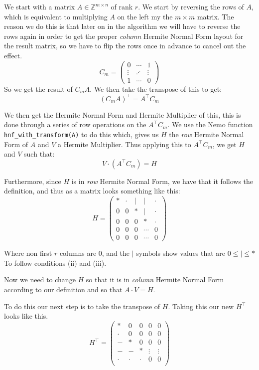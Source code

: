 \documentclass[oneside, a4paper, onecolumn, 11pt]{article}
\newcommand{\Zmn}[2]{\mathbb{Z}^{#1 \times #2}}
\begin{document}
We start with a matrix \(A \in \Zmn{m}{n}\) of rank \(r\). We start by reversing the rows of \(A\), which is equivalent to multiplying \(A\) on the left my the \(m \times m\) matrix. The reason we do this is that later on in the algorithm we will have to reverse the rows again in order to get the proper \textit{column} Hermite Normal Form layout for the result matrix, so we have to flip the rows once in advance to cancel out the effect.
\[
    C_m = \begin{pmatrix}
        0      & \cdots  & 1      \\
        \vdots & \iddots & \vdots \\
        1      & \cdots  & 0
    \end{pmatrix}
\]
So we get the result of \(C_m A\). We then take the transpose of this to get:
\[
    (C_m A)^\intercal = A^\intercal C_m
\]

We then get the Hermite Normal Form and Hermite Multiplier of this, this is done through a series of row operations on the \(A^\intercal C_m\). We use the Nemo function \texttt{hnf\_with\_transform(A)} to do this which, gives us \(H\) the \textit{row} Hermite Normal Form of \(A\) and \(V\) a Hermite Multiplier. Thus applying this to \(A^\intercal C_m\), we get \(H\) and \(V\) such that:
\[
    V \cdot (A^\intercal C_m) = H
\]

Furthermore, since \(H\) is in \textit{row} Hermite Normal Form, we have that it follows the definition, and thus as a matrix looks something like this:
\[
    H = \left(
    \begin{array}{ccccc}
            * & \cdot & | & |      & \cdot \\
            0 & 0     & * & |      & \cdot \\
            0 & 0     & 0 & *      & \cdot \\
            0 & 0     & 0 & \cdots & 0     \\
            0 & 0     & 0 & \cdots & 0
        \end{array}
    \right)
\]

Where non first \(r\) columns are \(0\), and the \(|\) symbols show values that are \(0 \le | \le *\) To follow conditions (ii) and (iii).

Now we need to change \(H\) so that it is in \textit{column} Hermite Normal Form according to our definition and so that \(A \cdot V = H\).

To do this our next step is to take the transpose of \(H\). Taking this our new \(H^\intercal\) looks like this.
\[
    H^\intercal = \left(
    \begin{array}{ccccc}
            *     & 0     & 0     & 0      & 0      \\
            \cdot & 0     & 0     & 0      & 0      \\
            -     & *     & 0     & 0      & 0      \\
            -     & -     & *     & \vdots & \vdots \\
            \cdot & \cdot & \cdot & 0      & 0      \\
        \end{array}
    \right)
\]
\end{document}
